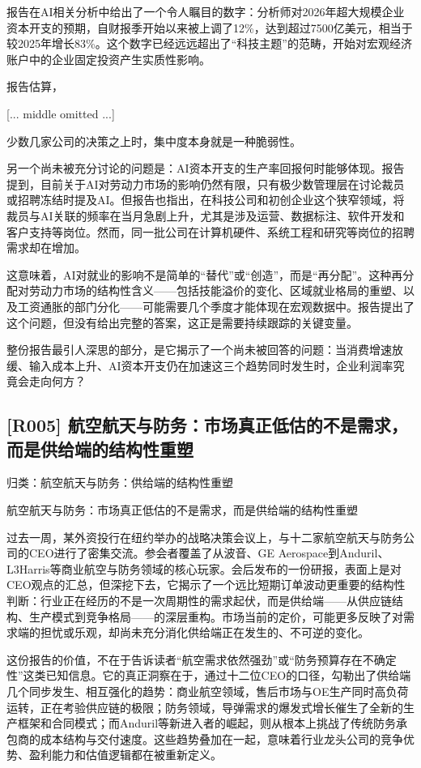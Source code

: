 \documentclass[11pt]{ctexart}
\begin{document}
报告在AI相关分析中给出了一个令人瞩目的数字：分析师对2026年超大规模企业资本开支的预期，自财报季开始以来被上调了12\%，达到超过7500亿美元，相当于较2025年增长83\%。这个数字已经远远超出了“科技主题”的范畴，开始对宏观经济账户中的企业固定投资产生实质性影响。

报告估算，

[... middle omitted ...]

少数几家公司的决策之上时，集中度本身就是一种脆弱性。

另一个尚未被充分讨论的问题是：AI资本开支的生产率回报何时能够体现。报告提到，目前关于AI对劳动力市场的影响仍然有限，只有极少数管理层在讨论裁员或招聘冻结时提及AI。但报告也指出，在科技公司和初创企业这个狭窄领域，将裁员与AI关联的频率在当月急剧上升，尤其是涉及运营、数据标注、软件开发和客户支持等岗位。然而，同一批公司在计算机硬件、系统工程和研究等岗位的招聘需求却在增加。

这意味着，AI对就业的影响不是简单的“替代”或“创造”，而是“再分配”。这种再分配对劳动力市场的结构性含义——包括技能溢价的变化、区域就业格局的重塑、以及工资通胀的部门分化——可能需要几个季度才能体现在宏观数据中。报告提出了这个问题，但没有给出完整的答案，这正是需要持续跟踪的关键变量。

整份报告最引人深思的部分，是它揭示了一个尚未被回答的问题：当消费增速放缓、输入成本上升、AI资本开支仍在加速这三个趋势同时发生时，企业利润率究竟会走向何方？

\subsection{[R005] 航空航天与防务：市场真正低估的不是需求，而是供给端的结构性重塑}
{\small\color{refgray}归类：航空航天与防务：供给端的结构性重塑}

航空航天与防务：市场真正低估的不是需求，而是供给端的结构性重塑

过去一周，某外资投行在纽约举办的战略决策会议上，与十二家航空航天与防务公司的CEO进行了密集交流。参会者覆盖了从波音、GE Aerospace到Anduril、L3Harris等商业航空与防务领域的核心玩家。会后发布的一份研报，表面上是对CEO观点的汇总，但深挖下去，它揭示了一个远比短期订单波动更重要的结构性判断：行业正在经历的不是一次周期性的需求起伏，而是供给端——从供应链结构、生产模式到竞争格局——的深层重构。市场当前的定价，可能更多反映了对需求端的担忧或乐观，却尚未充分消化供给端正在发生的、不可逆的变化。

这份报告的价值，不在于告诉读者“航空需求依然强劲”或“防务预算存在不确定性”这类已知信息。它的真正洞察在于，通过十二位CEO的口径，勾勒出了供给端几个同步发生、相互强化的趋势：商业航空领域，售后市场与OE生产同时高负荷运转，正在考验供应链的极限；防务领域，导弹需求的爆发式增长催生了全新的生产框架和合同模式；而Anduril等新进入者的崛起，则从根本上挑战了传统防务承包商的成本结构与交付速度。这些趋势叠加在一起，意味着行业龙头公司的竞争优势、盈利能力和估值逻辑都在被重新定义。
\end{document}
